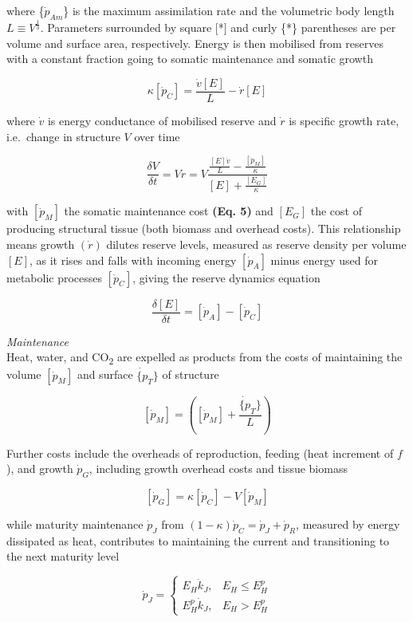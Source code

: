 \documentclass[]{article}
\begin{document}
where \{\(\dot{p}_{Am}\)\} is the maximum assimilation rate and the
volumetric body length \(L \equiv V^\frac{1}{3}\). Parameters surrounded
by square {[}*{]} and curly \{*\} parentheses are per volume and surface
area, respectively. Energy is then mobilised from reserves with a
constant fraction going to somatic maintenance and somatic growth

\[
  \kappa[\dot{p}_C] = \frac
  {\dot{v}[E]}
  {L}
  - \dot{r}[E]
\]

where \(\dot{v}\) is energy conductance of mobilised reserve and
\(\dot{r}\) is specific growth rate, i.e.~change in structure \(V\) over
time

\[
  \frac 
  {\delta V}
  {\delta t}
  = V\dot{r} 
  = V \frac
    {\frac 
    {[E]\dot{v}}
    {L} - \frac
    {[\dot {p}_M]}
    {\kappa}
    }
    {[E] + \frac
    {[E_G]}
    {\kappa}
    }
\]

with \([\dot{p}_M]\) the somatic maintenance cost \textbf{(Eq. 5)} and
\([E_G]\) the cost of producing structural tissue (both biomass and
overhead costs). This relationship means growth \((\dot{r})\) dilutes
reserve levels, measured as reserve density per volume \([E]\), as it
rises and falls with incoming energy \([\dot{p}_A]\) minus energy used
for metabolic processes \([\dot{p}_C]\), giving the reserve dynamics
equation

\[
  \frac 
  {\delta [E]}
  {\delta t} 
  = [\dot{p}_A] - [\dot{p}_C]
\]

\emph{Maintenance}\\
Heat, water, and CO\textsubscript{2} are expelled as products from the
costs of maintaining the volume \([\dot{p}_M]\) and surface
\(\dot{\{p}_T\}\) of structure

\[
  [\dot{p}_M] 
  = \left(
  [\dot{p}_M] + \frac
  {\dot{\{p}_T\}}
  {L}
  \right)
\]

Further costs include the overheads of reproduction, feeding (heat
increment of \(f\)), and growth \(\dot{p}_G\), including growth overhead
costs and tissue biomass

\[
  [\dot{p}_G] = \kappa [\dot{p}_C] - V [\dot{p}_M]
\]

while maturity maintenance \(\dot{p}_J\) from
\((1 - \kappa)\dot{p}_C = \dot{p}_J + \dot{p}_R\), measured by energy
dissipated as heat, contributes to maintaining the current and
transitioning to the next maturity level

\[
  \dot{p}_J = 
    \begin{cases}
      E_H \dot{k}_J, & E_H ≤ E^p_H \\
      E^p_H \dot{k}_J, & E_H > E^p_H
    \end{cases}
\]
\end{document}
